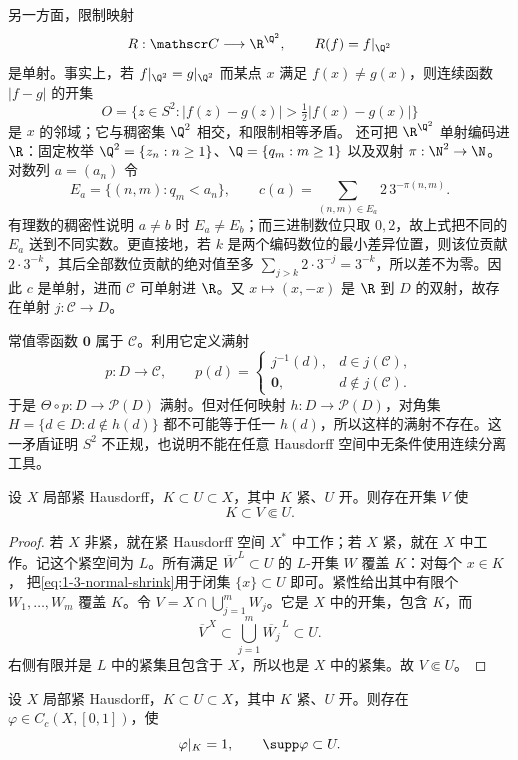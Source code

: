 另一方面，限制映射
\[
 R:\mathscr C\longrightarrow\R^{\Q^2},\qquad R(f)=f|_{\Q^2}
\]
是单射。事实上，若 $f|_{\Q^2}=g|_{\Q^2}$ 而某点 $x$ 满足 $f(x)\ne g(x)$，则连续函数
$|f-g|$ 的开集
\[
 O=\{z\in S^2:|f(z)-g(z)|>\tfrac12|f(x)-g(x)|\}
\]
是 $x$ 的邻域；它与稠密集 $\Q^2$ 相交，和限制相等矛盾。
还可把 $\R^{\Q^2}$ 单射编码进 $\R$：固定枚举
$\Q^2=\{z_n:n\ge1\}$、$\Q=\{q_m:m\ge1\}$ 以及双射
$\pi:\N^2\to\N$。对数列 $a=(a_n)$ 令
\[
 E_a=\{(n,m):q_m<a_n\},\qquad
 c(a)=\sum_{(n,m)\in E_a}2\,3^{-\pi(n,m)}.
\]
有理数的稠密性说明 $a\ne b$ 时 $E_a\ne E_b$；而三进制数位只取 $0,2$，故上式把不同的
$E_a$ 送到不同实数。更直接地，若 $k$ 是两个编码数位的最小差异位置，则该位贡献
$2\cdot3^{-k}$，其后全部数位贡献的绝对值至多
$\sum_{j>k}2\cdot3^{-j}=3^{-k}$，所以差不为零。因此 $c$ 是单射，进而 $\mathscr C$ 可单射进
$\R$。又 $x\mapsto(x,-x)$ 是 $\R$ 到 $D$ 的双射，故存在单射 $j:\mathscr C\to D$。

常值零函数 $\mathbf0$ 属于 $\mathscr C$。利用它定义满射
\[
 p:D\longrightarrow\mathscr C,\qquad
 p(d)=
 \begin{cases}
   j^{-1}(d),&d\in j(\mathscr C),\\
   \mathbf0,&d\notin j(\mathscr C).
 \end{cases}
\]
于是 $\Theta\circ p:D\to\mathcal P(D)$ 满射。但对任何映射
$h:D\to\mathcal P(D)$，对角集
$H=\{d\in D:d\notin h(d)\}$ 都不可能等于任一 $h(d)$，所以这样的满射不存在。这一矛盾证明
$S^2$ 不正规，也说明不能在任意 Hausdorff 空间中无条件使用连续分离工具。

\begin{proposition}[相对紧邻域引理]\label{proposition:1-3-1-1}
设 $X$ 局部紧 Hausdorff，$K\subset U\subset X$，其中 $K$ 紧、$U$ 开。则存在开集 $V$ 使
\[
  K\subset V\Subset U.
\]
\end{proposition}

\begin{proof}
若 $X$ 非紧，就在紧 Hausdorff 空间 $X^*$ 中工作；若 $X$ 紧，就在 $X$ 中工作。记这个紧空间为
$L$。所有满足 $\overline W^{\,L}\subset U$ 的 $L$-开集 $W$ 覆盖 $K$：对每个 $x\in K$，
把\eqref{eq:1-3-normal-shrink}用于闭集 $\{x\}\subset U$ 即可。紧性给出其中有限个
$W_1,\ldots,W_m$ 覆盖 $K$。令
$V=X\cap\bigcup_{j=1}^mW_j$。它是 $X$ 中的开集，包含 $K$，而
\[
 \overline V^{\,X}\subset\bigcup_{j=1}^m\overline{W_j}^{\,L}\subset U.
\]
右侧有限并是 $L$ 中的紧集且包含于 $X$，所以也是 $X$ 中的紧集。故 $V\Subset U$。
\end{proof}

\begin{theorem}[局部 Urysohn 引理]\label{theorem:1-3-1-2}
设 $X$ 局部紧 Hausdorff，$K\subset U\subset X$，其中 $K$ 紧、$U$ 开。则存在
$\varphi\in C_c(X,[0,1])$，使
\[
  \varphi|_K=1,\qquad \supp\varphi\subset U.
\]
\end{theorem}

